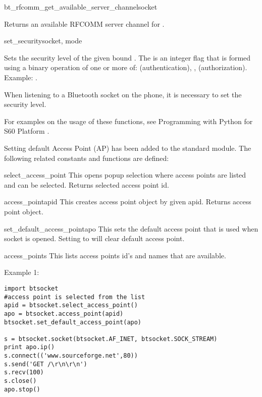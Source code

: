\begin{funcdesc}{bt_rfcomm_get_available_server_channel}{socket}

Returns an available RFCOMM server channel for .

\end{funcdesc}

\begin{funcdesc}{set_security}{socket, mode}

Sets the security level of the given bound . The 
 is an integer flag that is formed using a binary 
 operation of one or more of:  (authentication), 
,  (authorization). Example: 
.

\end{funcdesc}

\begin{notice}[note]
When listening to a Bluetooth socket on the phone, it is necessary to set 
the security level.
\end{notice}

For examples on the usage of these functions, see Programming with Python for 
S60 Platform \cite{PyS60Prog}.

Setting default Access Point (AP) has been added to the standard  
module. The following related constants and functions are defined:

\begin{funcdesc}{select_access_point}{}
This opens popup selection where access points are listed and can be selected.
Returns selected access point id.
\end{funcdesc}

\begin{funcdesc}{access_point}{apid}
This creates access point object by given apid. Returns access point object.
\end{funcdesc}

\begin{funcdesc}{set_default_access_point}{apo}
This sets the default access point that is used when socket is opened. Setting 
 to  will clear default access point.
\end{funcdesc}

\begin{funcdesc}{access_points}{}
This lists access points id's and names that are available. 
\end{funcdesc}

Example 1:
\begin{verbatim}
import btsocket
#access point is selected from the list
apid = btsocket.select_access_point()
apo = btsocket.access_point(apid)
btsocket.set_default_access_point(apo)

s = btsocket.socket(btsocket.AF_INET, btsocket.SOCK_STREAM)
print apo.ip()
s.connect(('www.sourceforge.net',80))
s.send('GET /\r\n\r\n')
s.recv(100)
s.close()
apo.stop()

\end{verbatim}

